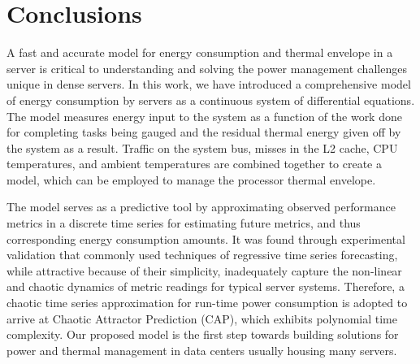 %
%
\chapter{Conclusions}
\label{chp:conclusions}
A fast and accurate model for energy consumption and thermal envelope in
a server is critical to understanding and solving the power management
challenges unique in dense servers.  In this work, we have introduced a
comprehensive model of energy consumption by servers as a continuous
system of differential equations.  The model measures energy input to
the system as a function of the work done for completing tasks being
gauged and the residual thermal energy given off by the system as a
result.  Traffic on the system bus, misses in the L2 cache, CPU
temperatures, and ambient temperatures are combined together to create a
model, which can be employed to manage the processor thermal envelope.

The model serves as a predictive tool by approximating observed
performance metrics in a discrete time series for estimating future
metrics, and thus corresponding energy consumption amounts.  It was
found through experimental validation that commonly used techniques of
regressive time series forecasting, while attractive because of their
simplicity, inadequately capture the non-linear and chaotic dynamics of
metric readings for typical server systems.  Therefore, a chaotic time
series approximation for run-time power consumption is adopted to arrive
at Chaotic Attractor Prediction (CAP), which exhibits polynomial time
complexity.  Our proposed model is the first step towards building
solutions for power and thermal management in data centers usually
housing many servers.

